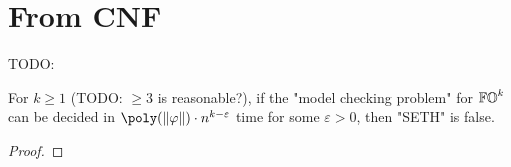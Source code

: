 \section{From CNF}\label{sec: from cnf}
\begin{yoshiki}
    TODO:
\end{yoshiki}

\begin{theorem}\label{theorem: SETH CNF}
    For $k \ge 1$ (TODO: $\ge 3$ is reasonable?),
    if the "model checking problem" for $\mathbb{FO}^{k}$  can be decided in $\poly(\len{\fml}) \cdot n^{k - \varepsilon}$ time for some $\varepsilon > 0$,
    then "SETH" is false.
\end{theorem}
\begin{proof}
\end{proof}

